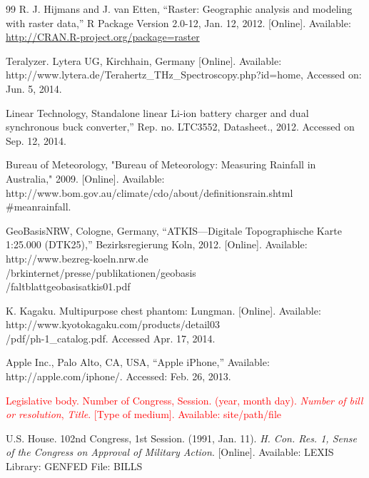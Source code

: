 \documentclass[11pt,a5paper,twoside]{article}
\begin{document}
\begin{thebibliography}{99}
 R. J. Hijmans and J. van Etten, ``Raster: Geographic analysis and 
modeling with raster data,'' R Package Version 2.0-12, Jan. 12, 2012. 
[Online]. Available: \underline {http://CRAN.R-project.org/package=raster }

 Teralyzer. Lytera UG, Kirchhain, Germany [Online]. Available: 
http://www.lytera.de/Terahertz{\_}THz{\_}Spectroscopy.php?id=home, Accessed on: Jun. 5, 2014. 

 Linear Technology, Standalone linear Li-ion battery charger and dual synchronous buck converter,'' Rep. no. LTC3552, Datasheet., 2012. Accessed on Sep. 12, 2014. 

 Bureau of Meteorology, "Bureau of Meteorology: Measuring Rainfall in Australia," 2009. [Online]. Available: http://www.bom.gov.au/climate/cdo/about/definitionsrain.shtml\\
{\#}meanrainfall. 

 GeoBasisNRW, Cologne, Germany, ``ATKIS---Digitale Topographische Karte 
1:25.000 (DTK25),'' Bezirksregierung Koln, 2012. [Online]. Available: 
http://www.bezreg-koeln.nrw.de\\
/brkinternet/presse/publikationen/geobasis\\
/faltblattgeobasisatkis01.pdf 

 K. Kagaku. Multipurpose chest phantom: Lungman. [Online]. Available: 
http://www.kyotokagaku.com/products/detail03\\/pdf/ph-1{\_}catalog.pdf. Accessed Apr. 17, 2014. 

 Apple Inc., Palo Alto, CA, USA, ``Apple iPhone,'' Available: 
http://apple.com/iphone/. Accessed: Feb. 26, 2013.



  \textcolor{red}{
Legislative body. Number of Congress, Session. (year, month day). 
\textit{Number of bill or resolution}, \textit{Title}. [Type of medium]. Available: site/path/file 
}

  U.S. House. 102nd Congress, 1st Session. (1991, Jan. 11). \textit{H. Con. Res. 1, Sense of the Congress on Approval of Military Action}. [Online]. Available: LEXIS Library: GENFED File: BILLS 


\end{thebibliography}
\end{document}
